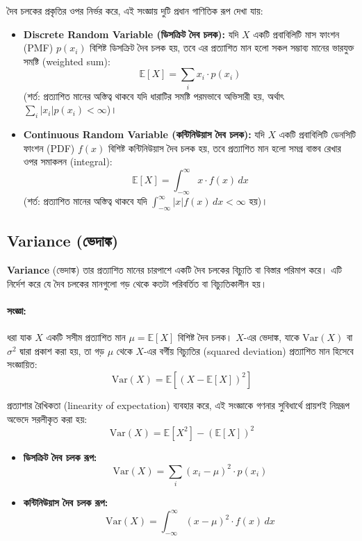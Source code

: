 \documentclass[12pt]{article}
\begin{document}
দৈব চলকের প্রকৃতির ওপর নির্ভর করে, এই সংজ্ঞায় দুটি প্রধান গাণিতিক রূপ দেখা যায়:
\begin{itemize}
    \item \textbf{Discrete Random Variable (ডিসক্রিট দৈব চলক):} যদি $X$ একটি প্রবাবিলিটি মাস ফাংশন (PMF) $p(x_i)$ বিশিষ্ট ডিসক্রিট দৈব চলক হয়, তবে এর প্রত্যাশিত মান হলো সকল সম্ভাব্য মানের ভারযুক্ত সমষ্টি (weighted sum):
    \[
    \mathbb{E}[X] = \sum_{i} x_i \cdot p(x_i)
    \]
    (শর্ত: প্রত্যাশিত মানের অস্তিত্ব থাকবে যদি ধারাটির সমষ্টি পরমভাবে অভিসারী হয়, অর্থাৎ $\sum_{i} |x_i| p(x_i) < \infty$)।
    
    \item \textbf{Continuous Random Variable (কন্টিনিউয়াস দৈব চলক):} যদি $X$ একটি প্রবাবিলিটি ডেনসিটি ফাংশন (PDF) $f(x)$ বিশিষ্ট কন্টিনিউয়াস দৈব চলক হয়, তবে প্রত্যাশিত মান হলো সমগ্র বাস্তব রেখার ওপর সমাকলন (integral):
    \[
    \mathbb{E}[X] = \int_{-\infty}^{\infty} x \cdot f(x) \, dx
    \]
    (শর্ত: প্রত্যাশিত মানের অস্তিত্ব থাকবে যদি $\int_{-\infty}^{\infty} |x| f(x) \, dx < \infty$ হয়)।
\end{itemize}

\subsection*{Variance (ভেদাঙ্ক)}

\textbf{Variance} (ভেদাঙ্ক) তার প্রত্যাশিত মানের চারপাশে একটি দৈব চলকের বিচ্যুতি বা বিস্তার পরিমাপ করে। এটি নির্দেশ করে যে দৈব চলকের মানগুলো গড় থেকে কতটা পরিবর্তিত বা বিচ্যুতিকালীন হয়।

\paragraph{সংজ্ঞা:}
ধরা যাক $X$ একটি সসীম প্রত্যাশিত মান $\mu = \mathbb{E}[X]$ বিশিষ্ট দৈব চলক। $X$-এর ভেদাঙ্ক, যাকে $\text{Var}(X)$ বা $\sigma^2$ দ্বারা প্রকাশ করা হয়, তা গড় $\mu$ থেকে $X$-এর বর্গীয় বিচ্যুতির (squared deviation) প্রত্যাশিত মান হিসেবে সংজ্ঞায়িত:
\[
\text{Var}(X) = \mathbb{E}\left[(X - \mathbb{E}[X])^2\right]
\]

প্রত্যাশার রৈখিকতা (linearity of expectation) ব্যবহার করে, এই সংজ্ঞাকে গণনার সুবিধার্থে প্রায়শই নিম্নরূপ অভেদে সরলীকৃত করা হয়:
\[
\text{Var}(X) = \mathbb{E}[X^2] - (\mathbb{E}[X])^2
\]

\begin{itemize}
    \item \textbf{ডিসক্রিট দৈব চলক রূপ:}
    \[
    \text{Var}(X) = \sum_{i} (x_i - \mu)^2 \cdot p(x_i)
    \]
    
    \item \textbf{কন্টিনিউয়াস দৈব চলক রূপ:}
    \[
    \text{Var}(X) = \int_{-\infty}^{\infty} (x - \mu)^2 \cdot f(x) \, dx
    \]
\end{itemize}
\end{document}
